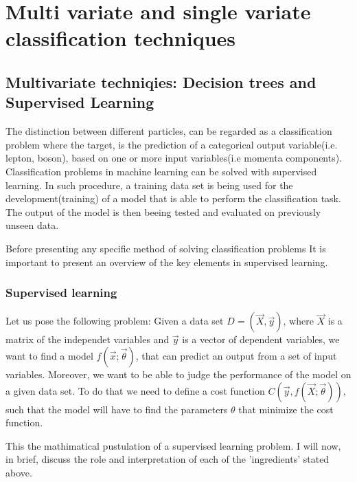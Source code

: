 \chapter{Multi variate and single variate classification techniques}
\label{sec:org6d2a2d0}
\section{Multivariate techniqies: Decision trees and Supervised Learning}
\label{sec:orgbbc6149}
The distinction between different particles, can be regarded as a classification problem where the target, is the prediction of a categorical output variable(i.e. lepton, boson), based on one or more input variables(i.e momenta components). Classification problems in  machine learning can be solved with supervised learning. In such procedure, a training data set is being used for the development(training) of a model that is able to perform the classification task. The output of the model is then beeing tested and evaluated on previously unseen data.

Before presenting any specific method of solving classification problems It is important to present an overview of the key elements in supervised learning.

\subsection{Supervised learning}
\label{sec:org0051e97}
Let us pose the following problem:
Given a data set \(D= (\vec{X}, \vec{y})\), where \(\vec{X}\) is a matrix of the independet variables and \(\vec{y}\) is a vector of dependent variables, we want to find a model \(f(\vec{x} ; \vec{\theta})\),  that can predict an output from a set of input variables. Moreover, we  want to be able to judge the performance of the model on a given data set. To do that we need to define a cost function \(C(\vec{y}, f(\vec{X}; \vec{\theta}))\), such that the model will have to find the parameters \(\theta\) that minimize the cost function.\cite{Mehta_2019}

This the mathimatical pustulation of a supervised learning problem. I will now, in brief, discuss the role and interpretation of each of the 'ingredients' stated above.

